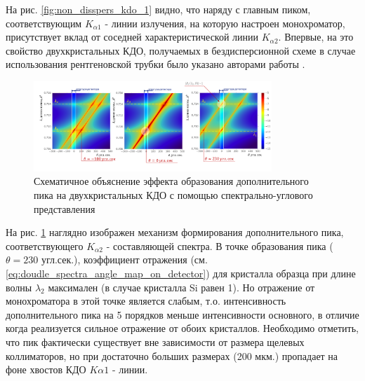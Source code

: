 На рис. \ref{fig:non_disspers_kdo_1} видно, что наряду с главным пиком, соответствующим $K_{\alpha1}$ - линии
излучения, на которую настроен монохроматор, присутствует вклад от соседней характеристической линии
 $K_{\alpha2}$. Впервые, на это свойство двухкристальных КДО, получаемых в бездисперсионной
схеме в случае использования рентгеновской трубки было указано авторами работы \cite{chuev2008}.

\begin{figure}[H]
  \centering
  \includegraphics[width=0.8\textwidth]{images/vklad_kalpha2.png}
  \caption{Схематичное объяснение эффекта образования дополнительного пика на двухкристальных КДО
  с помощью спектрально-углового представления}
  \label{ris:vklad_kalpha2}
\end{figure}

На рис. \ref{ris:vklad_kalpha2} наглядно изображен механизм формирования дополнительного пика,
соответствующего $K_{\alpha 2}$ - составляющей спектра. В точке образования пика ($\theta = 230$ угл.сек.), коэффициент
отражения  (см. \ref{eq:doudle_spectra_angle_map_on_detector})
для кристалла образца при длине волны $\lambda_2$ максимален (в случае кристалла Si равен 1). Но отражение
от монохроматора в этой точке является слабым, т.о. интенсивность дополнительного пика на 5 порядков меньше
интенсивности основного, в отличие когда реализуется сильное отражение от обоих кристаллов.
 Необходимо отметить, что пик фактически существует вне зависимости от размера щелевых коллиматоров, но
при достаточно больших размерах (200 мкм.) пропадает на фоне хвостов КДО $K{\alpha 1}$ - линии.
